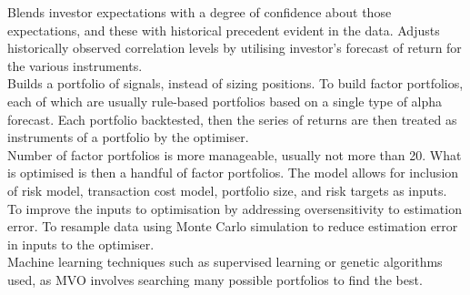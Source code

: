  Blends investor expectations with a degree of confidence about those expectations, and these with historical precedent evident in the data. Adjusts historically observed correlation levels by utilising investor's forecast of return for the various instruments. \\

 Builds a portfolio of signals, instead of sizing positions. To build factor portfolios, each of which are usually rule-based portfolios based on a single type of alpha forecast. Each portfolio backtested, then the series of returns are then treated as instruments of a portfolio by the optimiser.\\
Number of factor portfolios is more manageable, usually not more than 20. What is optimised is then a handful of factor portfolios. The model allows for inclusion of risk model, transaction cost model, portfolio size, and risk targets as inputs.\\

 To improve the inputs to optimisation by addressing oversensitivity to estimation error. To resample data using Monte Carlo simulation to reduce estimation error in inputs to the optimiser.\\

 Machine learning techniques such as supervised learning or genetic algorithms used, as MVO involves searching many possible portfolios to find the best.
